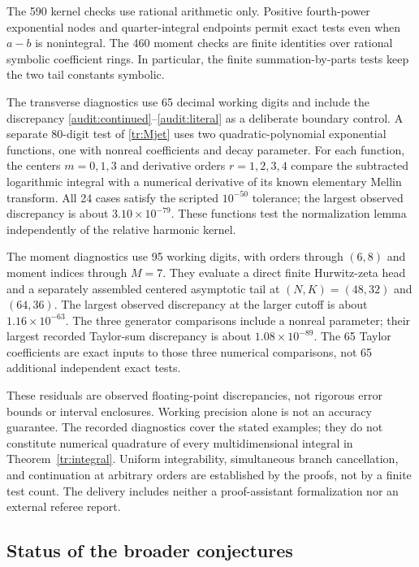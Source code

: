 The 590 kernel checks use rational arithmetic only.  Positive
fourth-power exponential nodes and quarter-integral endpoints permit
exact tests even when $a-b$ is nonintegral.  The 460 moment checks are
finite identities over rational symbolic coefficient rings.  In
particular, the finite summation-by-parts tests keep the two tail
constants symbolic.

The transverse diagnostics use 65 decimal working digits and include
the discrepancy \eqref{audit:continued}--\eqref{audit:literal} as a
deliberate boundary control.  A separate 80-digit test of
\eqref{tr:Mjet} uses two quadratic-polynomial exponential functions,
one with nonreal coefficients and decay parameter.  For each function,
the centers $m=0,1,3$ and derivative orders $r=1,2,3,4$ compare the
subtracted logarithmic integral with a numerical derivative of its
known elementary Mellin transform.  All 24 cases satisfy the scripted
$10^{-50}$ tolerance; the largest observed discrepancy is about
$3.10\times10^{-79}$.  These functions test the normalization lemma
independently of the relative harmonic kernel.

The moment diagnostics use 95 working
digits, with orders through $(6,8)$ and moment indices through $M=7$.
They evaluate a direct finite Hurwitz-zeta head and a separately
assembled centered asymptotic tail at $(N,K)=(48,32)$ and $(64,36)$.
The largest observed discrepancy at the larger cutoff is about
$1.16\times10^{-63}$.  The three generator comparisons include a
nonreal parameter; their largest recorded Taylor-sum discrepancy is
about $1.08\times10^{-89}$.  The 65 Taylor coefficients are exact
inputs to those three numerical comparisons, not 65 additional
independent exact tests.

These residuals are observed floating-point discrepancies, not rigorous
error bounds or interval enclosures.  Working precision alone is not
an accuracy guarantee.  The recorded diagnostics cover the stated
examples; they do not constitute numerical quadrature of every
multidimensional integral in Theorem~\ref{tr:integral}.  Uniform
integrability, simultaneous branch cancellation, and continuation at
arbitrary orders are established by the proofs, not by a finite test
count.  The delivery includes neither a proof-assistant formalization
nor an external referee report.

\subsection{Status of the broader conjectures}

